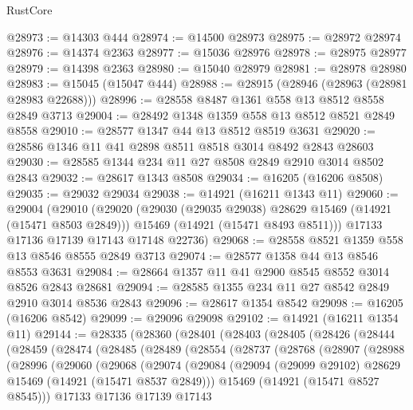 \begin{lexlean}{RustCore}
\begin{coremodule}
@28973 := @14303 @444
@28974 := @14500 @28973
@28975 := @28972 @28974
@28976 := @14374 @2363
@28977 := @15036 @28976
@28978 := @28975 @28977
@28979 := @14398 @2363
@28980 := @15040 @28979
@28981 := @28978 @28980
@28983 := @15045 (@15047 @444)
@28988 := @28915 (@28946 (@28963 (@28981 @28983 @22688)))
@28996 := @28558 @8487 @1361 @558 @13 @8512 @8558 @2849 @3713
@29004 := @28492 @1348 @1359 @558 @13 @8512 @8521 @2849 @8558
@29010 := @28577 @1347 @44 @13 @8512 @8519 @3631
@29020 := @28586 @1346 @11 @41 @2898 @8511 @8518 @3014 @8492 @2843 @28603
@29030 := @28585 @1344 @234 @11 @27 @8508 @2849 @2910 @3014 @8502 @2843
@29032 := @28617 @1343 @8508
@29034 := @16205 (@16206 @8508)
@29035 := @29032 @29034
@29038 := @14921 (@16211 @1343 @11)
@29060 := @29004
    (@29010
      (@29020
        (@29030 (@29035 @29038) @28629 @15469 (@14921 (@15471 @8503 @2849)))
        @15469
        (@14921 (@15471 @8493 @8511)))
      @17133
      @17136
      @17139
      @17143
      @17148
      @22736)
@29068 := @28558 @8521 @1359 @558 @13 @8546 @8555 @2849 @3713
@29074 := @28577 @1358 @44 @13 @8546 @8553 @3631
@29084 := @28664 @1357 @11 @41 @2900 @8545 @8552 @3014 @8526 @2843 @28681
@29094 := @28585 @1355 @234 @11 @27 @8542 @2849 @2910 @3014 @8536 @2843
@29096 := @28617 @1354 @8542
@29098 := @16205 (@16206 @8542)
@29099 := @29096 @29098
@29102 := @14921 (@16211 @1354 @11)
@29144 := @28335
    (@28360
      (@28401
        (@28403
          (@28405
            (@28426
              (@28444
                (@28459
                  (@28474
                    (@28485
                      (@28489
                        (@28554
                          (@28737
                            (@28768
                              (@28907
                                (@28988
                                  (@28996
                                    (@29060
                                      (@29068
                                        (@29074
                                          (@29084
                                            (@29094
                                              (@29099 @29102)
                                              @28629
                                              @15469
                                              (@14921 (@15471 @8537 @2849)))
                                            @15469
                                            (@14921 (@15471 @8527 @8545)))
                                          @17133
                                          @17136
                                          @17139
                                          @17143

\end{coremodule}
\end{lexlean}
